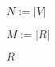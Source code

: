 \documentclass{article}
\begin{document}
$N := |V|$
\pagebreak

$M := |R|$
\pagebreak

$R$
\pagebreak
\end{document}
